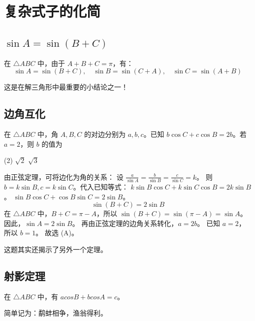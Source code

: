 
\section{复杂式子的化简}

\subsection{$\sin A = \sin(B+C)$}

\begin{theorem}
    在 $\triangle ABC$ 中，由于 $A+B+C=\pi$，有：
    $$\sin A = \sin(B+C), \quad \sin B = \sin(C+A), \quad \sin C = \sin(A+B)$$

    \begin{warning}
        这是在解三角形中最重要的小结论之一！
    \end{warning}
\end{theorem}

\subsection{边角互化}

\begin{example}
    在 $\triangle ABC$ 中，角 $A,B,C$ 的对边分别为 $a,b,c$。已知 $b\cos C + c\cos B = 2b$。若 $a=2$，则 $b$ 的值为
    \begin{tasks}(2)
        \task $\sqrt{2}$
        \task $\sqrt{3}$
    \end{tasks}
\end{example}

\begin{solution}
    由正弦定理，可将边化为角的关系：
    设 $\frac{a}{\sin A} = \frac{b}{\sin B} = \frac{c}{\sin C} = k$。
    则 $b=k\sin B, c=k\sin C$。代入已知等式：
    $k\sin B \cos C + k\sin C \cos B = 2k\sin B$。
    $\sin B \cos C + \cos B \sin C = 2\sin B$。
    $$
        \sin(B+C) = 2\sin B
    $$
    在 $\triangle ABC$ 中，$B+C = \pi - A$，所以 $\sin(B+C) = \sin(\pi - A) = \sin A$。
    因此，$\sin A = 2\sin B$。
    再由正弦定理的边角关系转化，$a = 2b$。
    已知 $a=2$，所以 $b=1$。
    故选 (A)。
\end{solution}

\begin{tips}
    这题其实还揭示了另外一个定理。
\end{tips}

\subsection{射影定理}
\begin{theorem}[射影定理]
    在 $\triangle ABC$ 中，有 $a cosB + b cosA = c$。

    简单记为：鹬蚌相争，渔翁得利。
\end{theorem}

